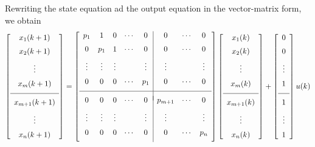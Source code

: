 \documentclass[11pt,a4paper,oneside]{book}
\numberwithin{equation}{section}
\theoremstyle{it}
\theoremstyle{definition}
\begin{document}
Rewriting the state equation ad the output equation in the vector-matrix form, we obtain 
\begin{equation}\label{pfepm_eq_20}
	\left[\begin{array}{c}
		x_1(k+1) \\[6pt]
		x_2(k+1) \\[6pt]
		\vdots \\[6pt]
		x_m(k+1) \\[6pt] \hline \\[-6pt]
		x_{m+1}(k+1) \\[6pt]
		\vdots \\[6pt]
		x_n(k+1)
	\end{array}\right] =
	\left[\begin{array}{ccccc|ccc}
		p_1 & 1 & 0 & \cdots & 0 & 0 & \cdots & 0 \\[6pt]
		0 & p_1 & 1 & \cdots & 0 & 0 & \cdots & 0 \\[6pt]
		\vdots & \vdots & \vdots &  & \vdots & \vdots &  & \vdots \\[6pt]
		0 & 0 & 0 & \cdots & p_1 & 0 & \cdots & 0 \\[6pt]\hline
		& & & & & & & \\[-6pt]
		0 & 0 & 0 & \cdots & 0 & p_{m+1} & \cdots & 0 \\[6pt]
		\vdots & \vdots & \vdots &  & \vdots & \vdots &  & \vdots \\[6pt]
		0 & 0 & 0 & \cdots & 0 & 0 & \cdots & p_{n} \\[6pt]
	\end{array}\right]
	\left[\begin{array}{c}
		x_1(k) \\[6pt]
		x_2(k) \\[6pt]
		\vdots \\[6pt]
		x_m(k) \\[6pt] \hline \\[-6pt]
		x_{m+1}(k) \\[6pt]
		\vdots \\[6pt]
		x_n(k)
	\end{array}\right] +
	\left[\begin{array}{c}
		0 \\[6pt]
		0 \\[6pt]
		\vdots \\[6pt]
		1 \\[6pt] \hline \\[-6pt]
		1 \\[6pt]
		\vdots \\[6pt]
		1
	\end{array}\right] u(k)
\end{equation}
\end{document}
